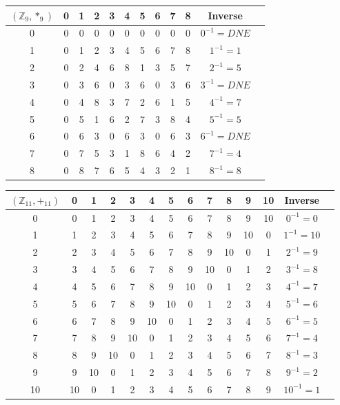 \documentclass{article}
\begin{document}
\begin{center}
	\begin{tabular}{ |c|c|c|c|c|c|c|c|c|c|c|c| } 
		\hline
		$(\mathbb{Z}_9,*_9)$  & 0 & 1 & 2 & 3 & 4 & 5 & 6 & 7 & 8 & Inverse \\
		\hline
		0 & 0 & 0 & 0 & 0 & 0 & 0 & 0 & 0 & 0 & $0^{-1}=DNE$ \\
		1 & 0 & 1 & 2 & 3 & 4 & 5 & 6 & 7 & 8 & $1^{-1}=1$ \\
		2 & 0 & 2 & 4 & 6 & 8 & 1 & 3 & 5 & 7 & $2^{-1}=5$ \\
		3 & 0 & 3 & 6 & 0 & 3 & 6 & 0 & 3 & 6 & $3^{-1}=DNE$ \\
		4 & 0 & 4 & 8 & 3 & 7 & 2 & 6 & 1 & 5 & $4^{-1}=7$ \\
		5 & 0 & 5 & 1 & 6 & 2 & 7 & 3 & 8 & 4 & $5^{-1}=5$ \\
		6 & 0 & 6 & 3 & 0 & 6 & 3 & 0 & 6 & 3 & $6^{-1}=DNE$ \\
		7 & 0 & 7 & 5 & 3 & 1 & 8 & 6 & 4 & 2 & $7^{-1}=4$ \\
		8 & 0 & 8 & 7 & 6 & 5 & 4 & 3 & 2 & 1 & $8^{-1}=8$ \\
		\hline
	\end{tabular}
\end{center}


\begin{center}
	\begin{tabular}{ |c|c|c|c|c|c|c|c|c|c|c|c|c|c| } 
		\hline
		$(\mathbb{Z}_{11},+_{11})$ & 0 & 1 & 2 & 3 & 4 & 5 & 6 & 7 & 8 & 9 & 10 & Inverse \\
		\hline
		0 & 0 & 1 & 2 & 3 & 4 & 5 & 6 & 7 & 8 & 9 & 10 & $0^{-1}=0$ \\
		1 & 1 & 2 & 3 & 4 & 5 & 6 & 7 & 8 & 9 & 10 & 0 & $1^{-1}=10$ \\
		2 & 2 & 3 & 4 & 5 & 6 & 7 & 8 & 9 & 10 & 0 & 1 & $2^{-1}=9$ \\
		3 & 3 & 4 & 5 & 6 & 7 & 8 & 9 & 10 & 0 & 1 & 2 & $3^{-1}=8$ \\
		4 & 4 & 5 & 6 & 7 & 8 & 9 & 10 & 0 & 1 & 2 & 3 & $4^{-1}=7$ \\
		5 & 5 & 6 & 7 & 8 & 9 & 10 & 0 & 1 & 2 & 3 & 4 & $5^{-1}=6$ \\
		6 & 6 & 7 & 8 & 9 & 10 & 0 & 1 & 2 & 3 & 4 & 5 & $6^{-1}=5$ \\
		7 & 7 & 8 & 9 & 10 & 0 & 1 & 2 & 3 & 4 & 5 & 6 & $7^{-1}=4$ \\
		8 & 8 & 9 & 10 & 0 & 1 & 2 & 3 & 4 & 5 & 6 & 7 & $8^{-1}=3$ \\
		9 & 9 & 10 & 0 & 1 & 2 & 3 & 4 & 5 & 6 & 7 & 8 & $9^{-1}=2$ \\
		10 & 10 & 0 & 1 & 2 & 3 & 4 & 5 & 6 & 7 & 8 & 9 & $10^{-1}=1$ \\
		\hline
	\end{tabular}
\end{center}
\end{document}

